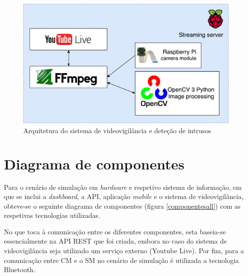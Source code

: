 


\begin{figure}[h]
	\centering
	\includegraphics[scale = 0.5]{esquemas/videostream.pdf}
	\caption{Arquitetura do sistema de videovigilância e deteção de intrusos }
	\label{arquiteturavisao}
\end{figure}







\section{Diagrama de componentes}

Para o cenário de simulação em \textit{hardware} e respetivo sistema de informação, em que se inclui a \textit{dashboard}, a \ac{API}, aplicação \textit{mobile} e o sistema de videovigilância, obteve-se o seguinte diagrama de componentes (figura \ref{componentesall}) com as respetivas tecnologias utilizadas. 

No que toca à comunicação entre os diferentes componentes, esta baseia-se essencialmente na API REST que foi criada, embora no caso do sistema de videovigilância seja utilizado um serviço externo (Youtube Live). Por fim, para a comunicação entre \acl{CM} e o \acl{SM} no cenário de simulação é utilizada a tecnologia Bluetooth. 



